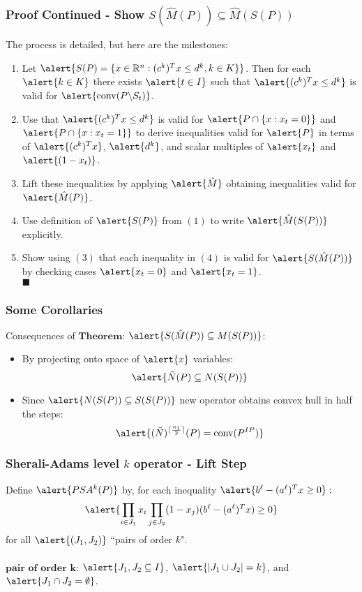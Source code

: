 \documentclass{beamer}
\DeclarePairedDelimiter{\ceil}{\lceil}{\rceil}
\DeclareMathOperator{\conv}{conv}
\begin{document}
\begin{frame}
\frametitle{Proof Continued - Show $S(\hat{M}(P)) \subseteq \hat{M}(S(P))$}
The process is detailed, but here are the milestones:
\begin{enumerate}
\item Let $\alert{S(P) = \{ x \in \R^n : (c^k)^T x \leq d^k, k \in K \}}$. Then for each $\alert{k \in K}$ there exists $\alert{t \in I}$ such that $\alert{(c^k)^T x \leq d^k}$ is valid for $\alert{\conv(P \backslash S_t)}$.
\item Use that $\alert{(c^k)^T x \leq d^k}$ is valid for $\alert{P \cap \{x:x_t = 0\}}$ and $\alert{P \cap \{x:x_t=1\}}$ to derive inequalities valid for $\alert{P}$ in terms of $\alert{(c^k)^T x}$, $\alert{d^k}$, and scalar multiples of $\alert{x_t}$ and $\alert{(1-x_t)}$.
\item Lift these inequalities by applying $\alert{\hat{M}}$ obtaining inequalities valid for $\alert{\hat{M}(P)}$.
\item Use definition of $\alert{S(P)}$ from $(1)$ to write $\alert{\hat{M}(S(P))}$ explicitly.
\item Show using $(3)$ that each inequality in $(4)$ is valid for $\alert{S(\hat{M}(P))}$ by checking cases $\alert{x_t = 0}$ and $\alert{x_t = 1}$.\\$\blacksquare$
\end{enumerate}
\end{frame}

\begin{frame}
\frametitle{Some Corollaries}
Consequences of $\textbf{Theorem:}$ $\alert{S(\hat{M}(P)) \subseteq M(S(P))}$:
\begin{itemize}
\item By projecting onto space of $\alert{x}$ variables: $$\alert{\tilde{N}(P) \subseteq N(S(P))}$$
\item Since $\alert{N(S(P)) \subseteq S(S(P))}$ new operator obtains convex hull in half the steps: $$\alert{(\tilde{N})^{\ceil{\frac{n_1}{2}}}(P) = \conv(P^{IP})}$$
\end{itemize}
\end{frame}

\begin{frame}
\frametitle{Sherali-Adams level $k$ operator - Lift Step}
Define $\alert{PSA^k(P)}$ by, for each inequality $\alert{b^\ell - (a^\ell)^Tx \geq 0}:$
$$\alert{\prod_{i \in J_1} x_i \prod_{j \in J_2} (1 - x_j) (b^\ell - (a^\ell)^Tx) \geq 0}$$
for all $\alert{(J_1, J_2)}$ ``pairs of order $k$".\\\ \\
$\textbf{pair of order k:}$ $\alert{J_1, J_2 \subseteq I}$, $\alert{|J_1 \cup J_2| = k}$, and $\alert{J_1 \cap J_2 = \emptyset}$.
\end{frame}
\end{document}
